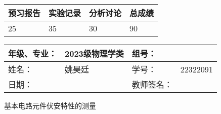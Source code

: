 \documentclass[dvipsnames, svgnames,a4paper,11pt]{article}
\newcommand{\exname}{基本电路元件伏安特性的测量}%
\begin{document}
\begin{table}
	\renewcommand\arraystretch{1.7}
	\begin{tabularx}{\textwidth}{
		|X|X|X|X
		|X|X|X|X|}
	\hline
	\multicolumn{2}{|c|}{预习报告}&\multicolumn{2}{|c|}{实验记录}&\multicolumn{2}{|c|}{分析讨论}&\multicolumn{2}{|c|}{总成绩}\\
	\hline
	 \hspace{0.625cm}25& & \hspace{0.625cm}35  & & \hspace{0.625cm}30  & &  \hspace{0.625cm}90 & \\
	\hline
	\end{tabularx}
\end{table}


\begin{table}
	\renewcommand\arraystretch{1.7}
	\begin{tabularx}{\textwidth}{|X|X|X|X|}
	\hline
	年级、专业：& 2023级物理学类 &组号：& \\
	\hline
	姓名：& 姚昊廷  & 学号：&22322091\\
	\hline
	日期：& & 教师签名：& \\
	\hline
	\end{tabularx}
\end{table}

\begin{center}
	\LARGE \exname
\end{center}
\end{document}
